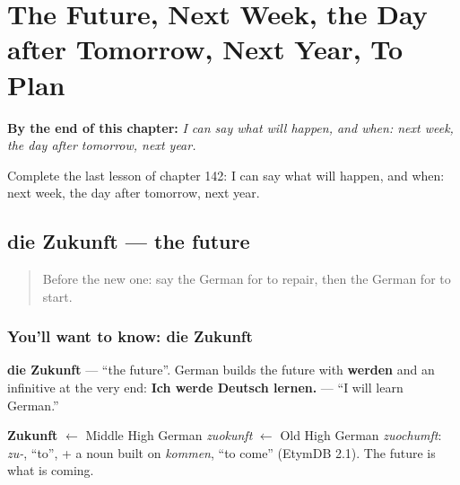 
\chapter{The Future, Next Week, the Day after Tomorrow, Next Year, To Plan}
\label{ch:ge-the-future-next-week-the-day-after-tomorrow-next-year-to-plan}

\begin{chapteropening}
\textbf{By the end of this chapter:} \emph{I can say what will happen, and when: next week, the day after tomorrow, next year.}

Complete the last lesson of chapter 142: I can say what will happen, and when: next week, the day after tomorrow, next year.
\end{chapteropening}

\section[die Zukunft]{die Zukunft — the future}

\label{lesson:GE-C142-zukunft}



\begin{quote}
Before the new one: say the German for to repair, then the German for to start.
\end{quote}

\subsection*{You'll want to know: die Zukunft}
\textbf{die Zukunft} — \textquotedblleft{}the future\textquotedblright{}. German builds the future with \textbf{werden} and an infinitive at the very end: \textbf{Ich werde Deutsch lernen.} — \textquotedblleft{}I will learn German.\textquotedblright{}

\begin{cousinweb}
\textbf{Zukunft} $\leftarrow$ Middle High German \emph{zuokunft} $\leftarrow$ Old High German \emph{zuochumft}: \emph{zu-}, \textquotedblleft{}to\textquotedblright{}, + a noun built on \emph{kommen}, \textquotedblleft{}to come\textquotedblright{} (EtymDB 2.1). The future is what is coming.
\end{cousinweb}

